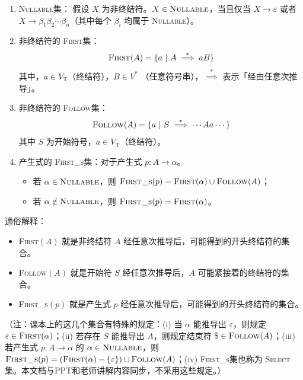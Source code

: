 \documentclass[UTF8]{ctexart}
\newcommand\FIRST{\textsc{First}}
\newcommand\FOLLOW{\textsc{Follow}}
\newcommand\NULLABLE{\textsc{Nullable}}
\newcommand\FIRSTS{\textsc{First\_s}}
\newcommand\deduce{\overset{*}{\implies}} %
\newcommand\VT{V_{\mathrm{T}}} %
\newcommand\Emph[1]{\textcolor{cyan!80!black}{#1}}
\newcommand\Notes[1]{\textcolor{yellow!50!black}{\small #1}}
\begin{document}
\begin{tcolorbox}[colback=violet!5, colframe=violet, boxrule=1pt, breakable]
\begin{enumerate}
  \item \Emph{\NULLABLE 集}：
    假设 $X$ 为非终结符。$X\in \NULLABLE$，当且仅当 $X\to \varepsilon$ 或者 $X\to \beta_1\beta_2\cdots\beta_n$（其中每个 $\beta_i$ 均属于 \NULLABLE）。
  \item 非终结符的 \Emph{\FIRST 集}：
    \begin{equation*}
      \FIRST(A) = \{a\ |\ A\deduce aB\}
    \end{equation*}
    其中，$a\in \VT$（终结符），$B \in V^*$ （任意符号串），$\deduce$ 表示「经由任意次推导」。
  \item 非终结符的 \Emph{\FOLLOW 集}：
    \begin{equation*}
      \FOLLOW(A) = \{a\ |\ S\deduce \cdots Aa\cdots \}
    \end{equation*}
    其中 $S$ 为开始符号，$a\in \VT$（终结符）。
  \item 产生式的 \Emph{\FIRSTS 集}：对于产生式 $p:A\to \alpha$。
    \begin{itemize}
      \item 若 $\alpha\in\NULLABLE$，则 $\FIRSTS(p) = \FIRST(\alpha)\cup \FOLLOW(A)$；
      \item 若 $\alpha\notin\NULLABLE$，则 $\FIRSTS(p) = \FIRST(\alpha)$。
    \end{itemize}
\end{enumerate}

通俗解释：
\begin{itemize}
  \item \FIRST$(A)$ 就是非终结符 $A$ 经任意次推导后，可能得到的开头终结符的集合。
  \item \FOLLOW$(A)$ 就是开始符 $S$ 经任意次推导后，$A$ 可能紧接着的终结符的集合。
  \item \FIRSTS$(p)$ 就是产生式 $p$ 经任意次推导后，可能得到的开头终结符的集合。
\end{itemize}

\Notes{（注：课本上的这几个集合有特殊的规定：(i) 当 $\alpha$ 能推导出 $\varepsilon$，则规定 $\varepsilon\in\FIRST(\alpha)$；(ii) 若存在 $S$ 能推导出 $A$，则规定结束符 $\$\in \FOLLOW(A)$；(iii) 若产生式 $p:A\to\alpha$ 的 $\alpha\in\NULLABLE$，则 $\FIRSTS(p) = (\FIRST(\alpha)-\{\varepsilon\})\cup \FOLLOW(A)$；(iv) \FIRSTS 集也称为 \textsc{Select} 集。本文档与PPT和老师讲解内容同步，不采用这些规定。）}

\end{tcolorbox}
\end{document}
